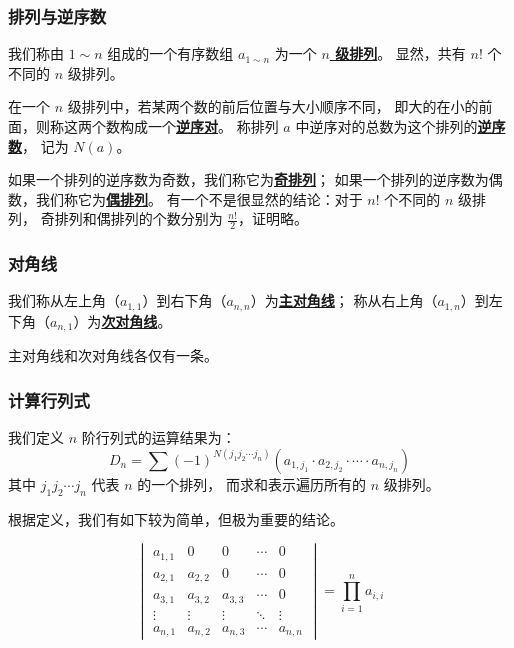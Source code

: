 \documentclass[UTF8]{article}
\begin{document}
	\subsubsection{排列与逆序数}

	我们称由 $1 \sim n$ 组成的一个有序数组
	$a_{1 \sim n}$ 为一个 \textbf{\uline{$n$ 级排列}}。
	显然，共有 $n!$ 个不同的 $n$ 级排列。

	在一个 $n$ 级排列中，若某两个数的前后位置与大小顺序不同，
	即大的在小的前面，则称这两个数构成一个\textbf{\uline{逆序对}}。
	称排列 $a$ 中逆序对的总数为这个排列的\textbf{\uline{逆序数}}，
	记为 $N(a)$。

	如果一个排列的逆序数为奇数，我们称它为\textbf{\uline{奇排列}}；
	如果一个排列的逆序数为偶数，我们称它为\textbf{\uline{偶排列}}。
	有一个不是很显然的结论：对于 $n!$ 个不同的 $n$ 级排列，
	奇排列和偶排列的个数分别为 $\frac {n!} {2}$，证明略。

	\subsubsection{对角线}

	我们称从左上角（$a_{1, 1}$）到右下角（$a_{n, n}$）为\textbf{\uline{主对角线}}；
	称从右上角（$a_{1, n}$）到左下角（$a_{n, 1}$）为\textbf{\uline{次对角线}}。

	主对角线和次对角线各仅有一条。

	\subsubsection{计算行列式}

	我们定义 $n$ 阶行列式的运算结果为：
	\begin{equation*}
		D_n =
		\sum (-1)^{N(j_1 j_2 \cdots j_n)}
		(a_{1, j_1} \cdot a_{2, j_2} \cdot \cdots \cdot a_{n, j_n})
	\end{equation*}
	其中 $j_1 j_2 \cdots j_n$ 代表 $n$ 的一个排列，
	而求和表示遍历所有的 $n$ 级排列。

	\bigskip

	根据定义，我们有如下较为简单，但极为重要的结论。

	\begin{equation*}
		\begin{vmatrix}
			a_{1, 1} & 0 & 0 & \cdots & 0
			\\
			a_{2, 1} & a_{2, 2} & 0 & \cdots & 0
			\\
			a_{3, 1} & a_{3, 2} & a_{3, 3} & \cdots & 0
			\\
			\vdots & \vdots & \vdots & \ddots & \vdots
			\\
			a_{n, 1} & a_{n, 2} & a_{n, 3} & \cdots & a_{n, n}
		\end{vmatrix}
		=
		\prod_{i = 1}^{n} a_{i, i}
	\end{equation*}
	\bigskip
\end{document}
